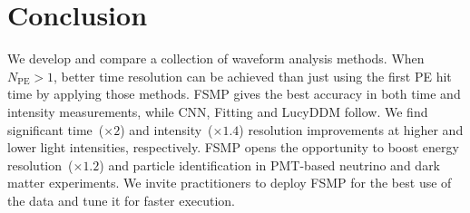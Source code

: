 \section{Conclusion}
\label{sec:conclusion}

We develop and compare a collection of waveform analysis methods.  When $N_\mathrm{PE} > 1$, better time resolution can be achieved than just using the first PE hit time by applying those methods.  FSMP gives the best accuracy in both time and intensity measurements, while CNN, Fitting and LucyDDM follow.  We find significant time~($\times 2$) and intensity~($\times 1.4$) resolution improvements at higher and lower light intensities, respectively.    FSMP opens the opportunity to boost energy resolution~($\times 1.2$) and particle identification in PMT-based neutrino and dark matter experiments.  We invite practitioners to deploy FSMP for the best use of the data and tune it for faster execution.
